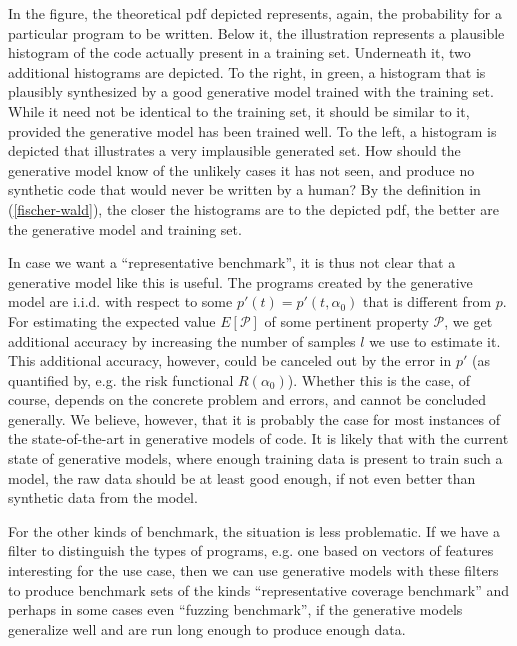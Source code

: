In the figure, the theoretical \ac{pdf} depicted represents, again, the probability for a particular program to be written.
Below it, the illustration represents a plausible histogram of the code actually present in a training set.
Underneath it, two additional histograms are depicted. To the right, in green, a histogram that is plausibly synthesized by a good generative model trained with the training set.
While it need not be identical to the training set, it should be similar to it, provided the generative model has been trained well.
To the left, a histogram is depicted that illustrates a very implausible generated set.
How should the generative model know of the unlikely cases it has not seen, and produce no synthetic code that would never be written by a human?
By the definition in (\ref{fischer-wald}), the closer the histograms are to the depicted pdf, the better are the generative model and training set.

In case we want a ``representative benchmark'', it is thus not clear that a generative model like this is useful.
The programs created by the generative model are i.i.d. with respect to some $p'(t) = p'(t,\alpha_0)$ that is different from $p$.
For estimating the expected value $E[\mathcal{P}]$ of some pertinent property $\mathcal{P}$, we get additional accuracy by increasing the number of samples $l$ we use to estimate it.
This additional accuracy, however, could be canceled out by the error in $p'$ (as quantified by, e.g. the risk functional $R(\alpha_0)$).
Whether this is the case, of course, depends on the concrete problem and errors, and cannot be concluded generally.
We believe, however, that it is probably the case for most instances of the state-of-the-art in generative models of code.
It is likely that with the current state of generative models, where enough training data is present to train such a model, the raw data should be at least good enough, if not even better than synthetic data from the model.

For the other kinds of benchmark, the situation is less problematic.
If we have a filter to distinguish the types of programs, e.g. one based on vectors of features interesting for the use case, then we can use generative models with these filters to produce benchmark sets of the kinds ``representative coverage benchmark'' and perhaps in some cases even ``fuzzing benchmark'', if the generative models generalize well and are run long enough to produce enough data.


